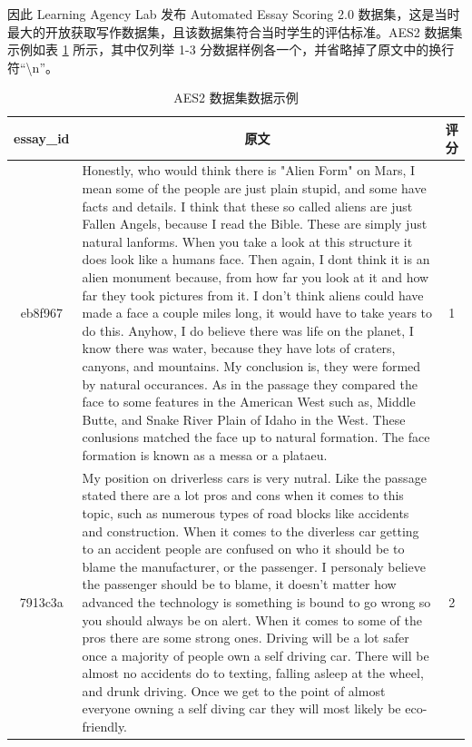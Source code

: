 因此 Learning Agency Lab 发布 Automated Essay Scoring 2.0 数据集，这是当时最大的开放获取写作数据集，且该数据集符合当时学生的评估标准。AES2 数据集示例如表 \ref{tab:AES2-example} 所示，其中仅列举 1-3 分数据样例各一个，并省略掉了原文中的换行符“\textbackslash{}n”。

\begin{table}[htbp]
\caption{AES2 数据集数据示例} \label{tab:AES2-example}
\begin{tabular}{cp{12cm}c}
\toprule
\textbf{essay\_id} & \multicolumn{1}{c}{\textbf{原文}}  & \textbf{评分} \\ \midrule
eb8f967 & Honestly, who would think there   is "Alien Form" on Mars, I mean some of the people are just plain   stupid, and some have facts and details. I think that these so called aliens   are just Fallen Angels, because I read the Bible. These are simply just   natural lanforms. When you take a look at this structure it does look like   a humans face. Then again, I dont think it is an alien monument because, from   how far you look at it and how far they took pictures from it. I don't think   aliens could have made a face a couple miles long, it would have to take   years to do this. Anyhow, I do believe there was life on the planet, I know   there was water, because they have lots of craters, canyons, and   mountains. My conclusion is, they were formed by natural occurances. As in   the passage they compared the face to some features in the American West such   as, Middle Butte, and Snake River Plain of Idaho in the West. These   conlusions matched the face up to natural formation. The face formation is   known as a messa or a plataeu.  & 1  \\ \midrule
7913c3a & My position on driverless cars   is very nutral. Like the passage stated there are a lot pros and cons when it   comes to this topic, such as numerous types of road blocks like accidents and   construction. When it comes to the diverless car getting to an accident   people are confused on who it should be to blame the manufacturer, or the   passenger. I personaly believe the passenger should be to blame, it doesn't   matter how advanced the technology is something is bound to go wrong so you   should always be on alert. When it comes to some of the pros there are   some strong ones. Driving will be a lot safer once a majority of people own a   self driving car. There will be almost no accidents do to texting, falling   asleep at the wheel, and drunk driving. Once we get to the point of almost   everyone owning a self diving car they will most likely be eco-friendly. & 2  \\ \midrule

\end{tabular}
\end{table}
